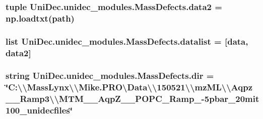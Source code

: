 \subsubsection[{data2}]{\setlength{\rightskip}{0pt plus 5cm}tuple Uni\+Dec.\+unidec\+\_\+modules.\+Mass\+Defects.\+data2 = np.\+loadtxt({\bf path})}\label{namespace_uni_dec_1_1unidec__modules_1_1_mass_defects_acb92eaa7d0baab1f8eb26bca0f122616}
\hypertarget{namespace_uni_dec_1_1unidec__modules_1_1_mass_defects_abb79625f9bbc1bde880bacfc9f1c25c2}{}
\subsubsection[{datalist}]{\setlength{\rightskip}{0pt plus 5cm}list Uni\+Dec.\+unidec\+\_\+modules.\+Mass\+Defects.\+datalist = \mbox{[}{\bf data}, {\bf data2}\mbox{]}}\label{namespace_uni_dec_1_1unidec__modules_1_1_mass_defects_abb79625f9bbc1bde880bacfc9f1c25c2}
\hypertarget{namespace_uni_dec_1_1unidec__modules_1_1_mass_defects_a451b712e413ab73c46513a51c4286192}{}
\subsubsection[{dir}]{\setlength{\rightskip}{0pt plus 5cm}string Uni\+Dec.\+unidec\+\_\+modules.\+Mass\+Defects.\+dir = \char`\"{}C\+:\textbackslash{}\textbackslash{}\+Mass\+Lynx\textbackslash{}\textbackslash{}\+Mike.\+P\+R\+O\textbackslash{}\+Data\textbackslash{}\textbackslash{}150521\textbackslash{}\textbackslash{}mz\+M\+L\textbackslash{}\textbackslash{}\+Aqpz\+\_\+\_\+\+Ramp3\textbackslash{}\textbackslash{}\+M\+T\+M\+\_\+\_\+\+Aqp\+Z\+\_\+\_\+\+P\+O\+P\+C\+\_\+\+Ramp\+\_-\/5pbar\+\_\+20mit100\+\_\+unidecfiles\char`\"{}}\label{namespace_uni_dec_1_1unidec__modules_1_1_mass_defects_a451b712e413ab73c46513a51c4286192}
\hypertarget{namespace_uni_dec_1_1unidec__modules_1_1_mass_defects_a425742773f2151e1357cd0de46d2727f}{}
